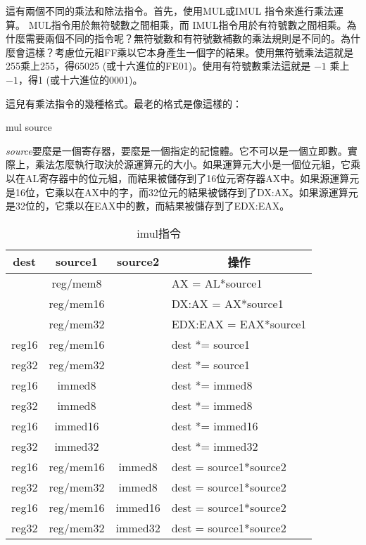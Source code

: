   
這有兩個不同的乘法和除法指令。首先，使用{\code MUL}或{\code IMUL}
指令來進行乘法運算。 {\code MUL}指令用於無符號數之間相乘，而 {\code
IMUL}指令用於有符號數之間相乘。為什麼需要兩個不同的指令呢？無符號數和有符號數補數的乘法規則是不同的。為什麼會這樣？考慮位元組FF乘以它本身產生一個字的結果。使用無符號乘法這就是255乘上255，得65025
(或十六進位的FE01)。使用有符號數乘法這就是 $-1$ 乘上 $-1$，得1
(或十六進位的0001)。

這兒有乘法指令的幾種格式。最老的格式是像這樣的：
\begin{AsmCodeListing}[numbers=none,frame=none]
      mul   source
\end{AsmCodeListing}
\emph{source}要麼是一個寄存器，要麼是一個指定的記憶體。它不可以是一個立即數。實際上，乘法怎麼執行取決於源運算元的大小。如果運算元大小是一個位元組，它乘以在AL寄存器中的位元組，而結果被儲存到了16位元寄存器AX中。如果源運算元是16位，它乘以在AX中的字，而32位元的結果被儲存到了DX:AX。如果源運算元是32位的，它乘以在EAX中的數，而結果被儲存到了EDX:EAX。

\begin{table}[t]
\centering
\begin{tabular}{|c|c|c|l|}
\hline { \bf dest} & { \bf source1 } & {\bf source2} &\multicolumn{1}{c|}{\bf 操作} \\ \hline
            & reg/mem8        &               & AX = AL*source1 \\
            & reg/mem16       &               & DX:AX = AX*source1 \\
            & reg/mem32       &               & EDX:EAX = EAX*source1 \\
reg16       & reg/mem16       &               & dest *= source1 \\
reg32       & reg/mem32       &               & dest *= source1 \\
reg16       & immed8          &               & dest *= immed8 \\
reg32       & immed8          &               & dest *= immed8 \\
reg16       & immed16         &               & dest *= immed16 \\
reg32       & immed32         &               & dest *= immed32 \\
reg16       & reg/mem16       & immed8        & dest = source1*source2 \\
reg32       & reg/mem32       & immed8        & dest = source1*source2 \\
reg16       & reg/mem16       & immed16       & dest = source1*source2 \\
reg32       & reg/mem32       & immed32       & dest = source1*source2 \\
\hline
\end{tabular}
\caption{{\code imul}指令 \label{tab:imul}}
\end{table}

